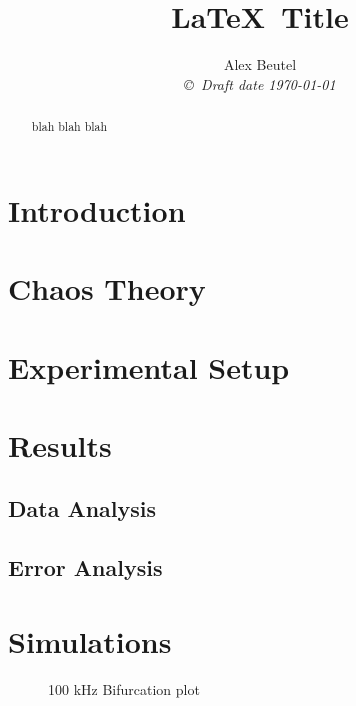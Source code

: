 \documentclass[12pt]{report}
\title{\LaTeX \ Title }
\author{Alex Beutel  \\
{\small\em \copyright \  Draft date \today }}
\date{ }
\begin{document}
\maketitle
\begin{abstract}
	blah blah blah
\end{abstract}
\tableofcontents
\listoffigures
\listoftables

\pagestyle{headings}

\pagestyle{plain}

\chapter{Introduction}



\chapter{Chaos Theory}

\chapter{Experimental Setup}

\chapter{Results}

\section{Data Analysis} %
\label{sec:Data Analysis}


\section{Error Analysis} %
\label{sec:Error Analysis}


\chapter{Simulations} %
\label{ch:Simulations}


	\begin{figure}[h]
		\centering
		
		\label{fig:100khzBifurcation}
		\caption{100 kHz Bifurcation plot}
	\end{figure}
	
\end{document}
